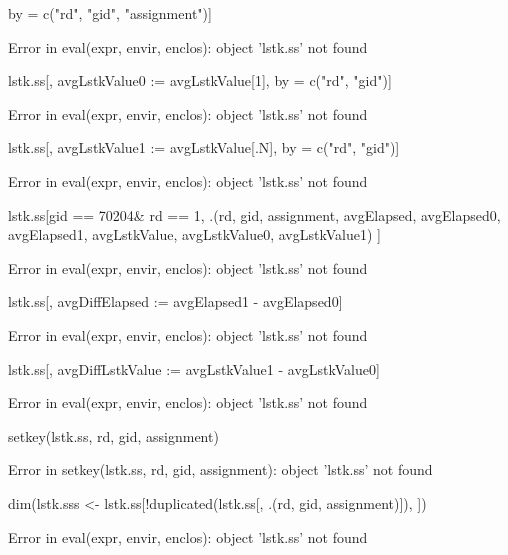 \begin{Schunk}
\begin{Sinput}
	by = c("rd", "gid", "assignment")]
\end{Sinput}
\begin{Soutput}
Error in eval(expr, envir, enclos): object 'lstk.ss' not found
\end{Soutput}
\begin{Sinput}
lstk.ss[, avgLstkValue0 := avgLstkValue[1], by = c("rd", "gid")]
\end{Sinput}
\begin{Soutput}
Error in eval(expr, envir, enclos): object 'lstk.ss' not found
\end{Soutput}
\begin{Sinput}
lstk.ss[, avgLstkValue1 := avgLstkValue[.N], by = c("rd", "gid")]
\end{Sinput}
\begin{Soutput}
Error in eval(expr, envir, enclos): object 'lstk.ss' not found
\end{Soutput}
\begin{Sinput}
lstk.ss[gid == 70204& rd == 1, .(rd, gid, assignment, avgElapsed, 
	avgElapsed0, avgElapsed1, avgLstkValue, avgLstkValue0, avgLstkValue1) ]
\end{Sinput}
\begin{Soutput}
Error in eval(expr, envir, enclos): object 'lstk.ss' not found
\end{Soutput}
\begin{Sinput}
lstk.ss[, avgDiffElapsed := avgElapsed1 - avgElapsed0]
\end{Sinput}
\begin{Soutput}
Error in eval(expr, envir, enclos): object 'lstk.ss' not found
\end{Soutput}
\begin{Sinput}
lstk.ss[, avgDiffLstkValue := avgLstkValue1 - avgLstkValue0]
\end{Sinput}
\begin{Soutput}
Error in eval(expr, envir, enclos): object 'lstk.ss' not found
\end{Soutput}
\begin{Sinput}
setkey(lstk.ss, rd, gid, assignment)
\end{Sinput}
\begin{Soutput}
Error in setkey(lstk.ss, rd, gid, assignment): object 'lstk.ss' not found
\end{Soutput}
\begin{Sinput}
dim(lstk.sss <- lstk.ss[!duplicated(lstk.ss[, .(rd, gid, assignment)]), ])
\end{Sinput}
\begin{Soutput}
Error in eval(expr, envir, enclos): object 'lstk.ss' not found
\end{Soutput}
\end{Schunk}
